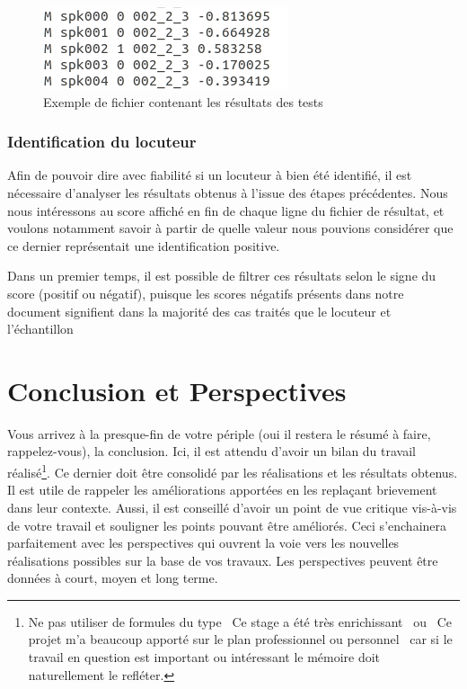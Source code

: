 \documentclass[a4paper, 12pt]{book}
\begin{document}
\begin{figure}[htbp]
  \centering
  \includegraphics[width=0.5\linewidth]{images/goodResultExample.png}
  \caption{Exemple de fichier contenant les résultats des tests}
\end{figure}
 

\subsection{Identification du locuteur}

Afin de pouvoir dire avec fiabilité si un locuteur à bien été identifié, il est nécessaire d'analyser les résultats obtenus à l'issue des étapes précédentes. Nous nous intéressons au score affiché en fin de chaque ligne du fichier de résultat, et voulons notamment savoir à partir de quelle valeur nous pouvions considérer que ce dernier représentait une identification positive.

Dans un premier temps, il est possible de filtrer ces résultats selon le signe du score (positif ou négatif), puisque les scores négatifs présents dans notre document signifient dans la majorité des cas traités que le locuteur et l'échantillon 


\chapter{Conclusion et Perspectives\label{chap-conclusion}}
Vous arrivez à la presque-fin de votre périple (oui il restera le
résumé à faire, rappelez-vous), la conclusion. Ici, il est attendu
d'avoir un bilan du travail réalisé\footnote{Ne pas utiliser de
  formules du type \guillemotleft{}~Ce stage a été très
  enrichissant~\guillemotright{} ou \guillemotleft{}~Ce projet m'a
  beaucoup apporté sur le plan professionnel ou
  personnel~\guillemotright{} car si le travail en question est
  important ou intéressant le mémoire doit naturellement le
  refléter.}. Ce dernier doit être consolidé par les réalisations et
les résultats obtenus. Il est utile de rappeler les améliorations
apportées en les replaçant brievement dans leur contexte. Aussi, il est
conseillé d'avoir un point de vue critique vis-à-vis de votre travail
et souligner les points pouvant être améliorés. Ceci s'enchainera
parfaitement avec les perspectives qui ouvrent la voie vers les
nouvelles réalisations possibles sur la base de vos travaux. Les
perspectives peuvent être données à court, moyen et long terme.
\end{document}
